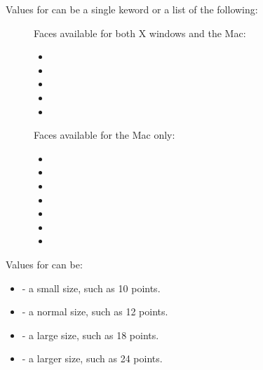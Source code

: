   
    
Values for  can be a single keword or a list of the following:
\begin{description}
\item[] Faces available for both X windows and the Mac:
\begin{itemize}
\item {}

\item {}

\item \newcolumn{}

\item {}

\item {}
\end{itemize}

\begin{group}
Faces available for the Mac only:
\begin{itemize}
\item {}

\item {}

\item {}

\item \newcolumn{}

\item {}

\item {}

\item {}
\end{itemize}
\end{group}
\end{description}

\begin{group}
   
Values for  can be:
\begin{itemize}
\item {} - a small size, such as 10 points.

\item {} - a normal size, such as 12 points.

\item {} - a large size, such as 18 points.

\item {} - a larger size, such as 24 points.

\end{itemize}
\end{group}

